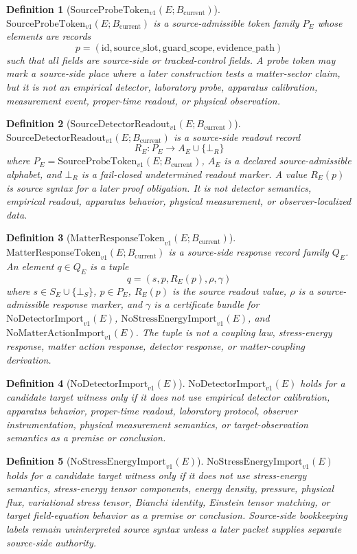 \documentclass[11pt]{article}
\newcommand{\Bcur}{B_{\mathrm{current}}}
\newcommand{\ProbeToken}{\mathrm{SourceProbeToken}_{v1}}
\newcommand{\DetectorReadout}{\mathrm{SourceDetectorReadout}_{v1}}
\newcommand{\ResponseToken}{\mathrm{MatterResponseToken}_{v1}}
\newcommand{\NoSE}{\mathrm{NoStressEnergyImport}_{v1}}
\newcommand{\NoAction}{\mathrm{NoMatterActionImport}_{v1}}
\newcommand{\NoDetector}{\mathrm{NoDetectorImport}_{v1}}
\newtheorem{definition}{Definition}
\begin{document}
\begin{definition}[\(\ProbeToken(E;\Bcur)\)]
\(\ProbeToken(E;\Bcur)\) is a source-admissible token family
\(P_E\) whose elements are records
\[
  p=(\mathrm{id},\mathrm{source\_slot},\mathrm{guard\_scope},
  \mathrm{evidence\_path})
\]
such that all fields are source-side or tracked-control fields. A probe token
may mark a source-side place where a later construction tests a matter-sector
claim, but it is not an empirical detector, laboratory probe, apparatus
calibration, measurement event, proper-time readout, or physical observation.
\end{definition}

\begin{definition}[\(\DetectorReadout(E;\Bcur)\)]
\(\DetectorReadout(E;\Bcur)\) is a source-side readout record
\[
  R_E:P_E \longrightarrow A_E \cup \{\bot_R\}
\]
where \(P_E=\ProbeToken(E;\Bcur)\), \(A_E\) is a declared source-admissible
alphabet, and \(\bot_R\) is a fail-closed undetermined readout marker. A value
\(R_E(p)\) is source syntax for a later proof obligation. It is not detector
semantics, empirical readout, apparatus behavior, physical measurement, or
observer-localized data.
\end{definition}

\begin{definition}[\(\ResponseToken(E;\Bcur)\)]
\(\ResponseToken(E;\Bcur)\) is a source-side response record family \(Q_E\).
An element \(q\in Q_E\) is a tuple
\[
  q=(s,p,R_E(p),\rho,\gamma)
\]
where \(s\in S_E\cup\{\bot_S\}\), \(p\in P_E\), \(R_E(p)\) is the source
readout value, \(\rho\) is a source-admissible response marker, and
\(\gamma\) is a certificate bundle for \(\NoDetector(E)\), \(\NoSE(E)\), and
\(\NoAction(E)\). The tuple is not a coupling law, stress-energy response,
matter action response, detector response, or matter-coupling derivation.
\end{definition}

\begin{definition}[\(\NoDetector(E)\)]
\(\NoDetector(E)\) holds for a candidate target witness only if it does not use
empirical detector calibration, apparatus behavior, proper-time readout,
laboratory protocol, observer instrumentation, physical measurement semantics,
or target-observation semantics as a premise or conclusion.
\end{definition}

\begin{definition}[\(\NoSE(E)\)]
\(\NoSE(E)\) holds for a candidate target witness only if it does not use
stress-energy semantics, stress-energy tensor components, energy density,
pressure, physical flux, variational stress tensor, Bianchi identity,
Einstein tensor matching, or target field-equation behavior as a premise or
conclusion. Source-side bookkeeping labels remain uninterpreted source syntax
unless a later packet supplies separate source-side authority.
\end{definition}
\end{document}
